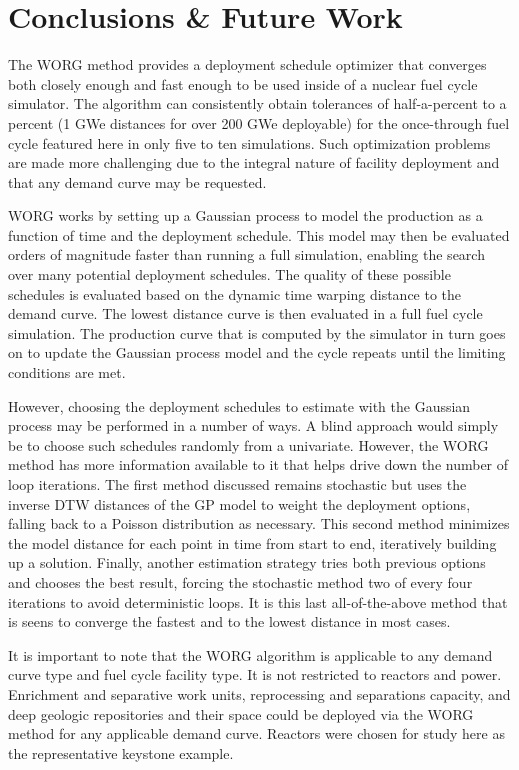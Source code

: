 \section{Conclusions \& Future Work}
\label{conclusion}

The WORG method provides a deployment schedule optimizer that converges 
both closely enough and fast enough to be used inside
of a nuclear fuel cycle simulator. The algorithm can consistently obtain
tolerances of half-a-percent to a percent (1 GWe distances for over 200 GWe
deployable) for the once-through fuel cycle featured here in only five to 
ten simulations. Such optimization problems are made
more challenging due to the integral nature of facility deployment and
that any demand curve may be requested.

WORG works by setting up a Gaussian process to model the production
as a function of time and the deployment schedule. This model may then
be evaluated orders of magnitude faster than running a full simulation, enabling
the search over many potential deployment schedules. The quality of these
possible schedules is evaluated based on the dynamic time warping distance
to the demand curve. The lowest distance curve is then evaluated in a
full fuel cycle simulation. The production curve that is computed by the 
simulator in turn goes on to update the Gaussian process model and the
cycle repeats until the limiting conditions are met.

However, choosing the deployment schedules to estimate with the Gaussian
process may be performed in a number of ways. A blind approach would
simply be to choose such schedules randomly from a univariate. However, 
the WORG method has more information available to it that helps drive 
down the number of loop iterations. The first method discussed remains 
stochastic but uses the inverse DTW distances of the GP model to 
weight the deployment options, falling back to a Poisson distribution as 
necessary. This second method minimizes the model distance for each point 
in time from start to end, iteratively building up a solution. Finally, 
another estimation strategy tries both previous options and chooses the 
best result, forcing the stochastic method two of every four iterations 
to avoid deterministic loops.  It is this last all-of-the-above method 
that is seens to converge the fastest and to the lowest distance in most 
cases.

It is important to note that the WORG algorithm is applicable to any 
demand curve type and fuel cycle facility type. It is not restricted to 
reactors and power.  Enrichment and separative work units, reprocessing
and separations capacity, and deep geologic repositories and their
space could be deployed via the WORG method for any applicable demand 
curve.  Reactors were chosen for study here as the representative keystone 
example.


